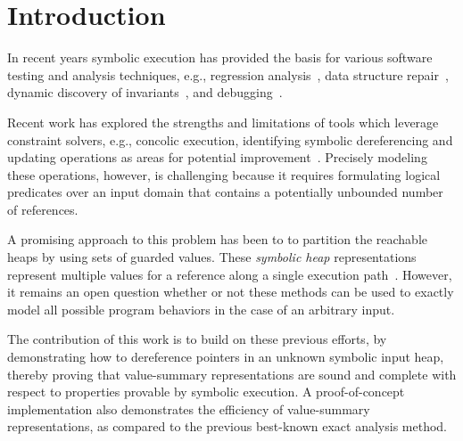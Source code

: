 \section{Introduction}

In recent years symbolic execution has provided the basis for various
software testing and analysis techniques, e.g., regression
analysis~\cite{backes:2012,Godefroid:SAS11,Person:FSE08,person:pldi2011,Ramos:2011,Yang:ISSTA12},
data structure repair~\cite{KhurshidETAL05RepairingStructurally},
dynamic discovery of
invariants~\cite{CsallnerETAL08DySy,Zhang:ISSTA14}, and
debugging~\cite{Ma:2011}.

Recent work has explored the strengths and limitations of
tools which leverage constraint solvers, e.g., concolic execution,
identifying symbolic dereferencing and updating operations as areas
for potential improvement~\cite{Chen:2013,Qu:2011}.  Precisely
modeling these operations, however, is challenging because it requires
formulating logical predicates over an input domain that contains a
potentially unbounded number of references.

A promising approach to this problem has been to
to partition the reachable heaps by using sets of guarded values.
These \emph{symbolic heap}
representations represent multiple values for a reference along a single execution
path~\cite{Dillig:2011,Elkarablieh:2009,Sen:2014,Torlak:2014,Xie:2005,Yorsh:2008}. However, it remains an open question whether or not these methods can be used to exactly model all possible program behaviors in the case of an arbitrary input.

The contribution of this work is to build on these previous efforts, by demonstrating how to dereference pointers in an unknown symbolic input heap, thereby proving that value-summary representations are sound and complete with respect to properties provable by symbolic execution. A proof-of-concept implementation also demonstrates the efficiency of value-summary representations, as compared to the previous best-known exact analysis method.  

